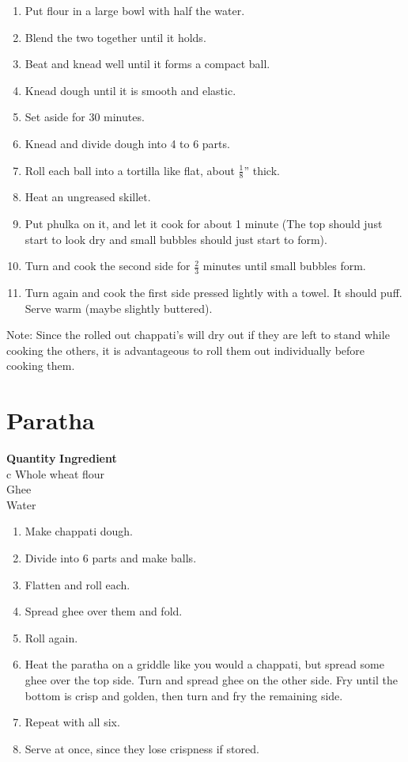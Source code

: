 \begin{enumerate}
\item  Put flour in a large bowl with half the water.
\item Blend the two together until it holds.
\item Beat and knead well until it forms a compact ball.
\item Knead dough until it is smooth and elastic.
\item Set aside for 30 minutes.
\item  Knead and divide dough into 4 to 6 parts.
\item Roll each ball into a tortilla like flat, about $\frac{1}{8}$'' thick.
\item Heat an ungreased skillet.
\item Put phulka on it, and let it cook for about 1 minute (The top should just start to 
look dry and small bubbles should just start to form).
\item Turn and cook the second side for $\frac{2}{3}$ minutes until small 
    bubbles form.
\item  Turn again and cook the first side pressed lightly with a towel.
It should puff. Serve warm (maybe slightly buttered).
\end{enumerate}

Note: Since the rolled out chappati's will dry out if they are left to stand while
cooking the others, it is advantageous to roll them out individually before 
cooking them.

\section{Paratha}
\begin{tabbing}
\hspace{1.0cm}  \={\bf Quantity}   \hspace{3.0cm} \={\bf Ingredient}\\

 c \> Whole wheat flour\\
\> \> Ghee\\
\> \>  Water \\
\end{tabbing}

\begin{enumerate}
\item  Make chappati dough.
\item Divide into 6 parts and make balls.
\item Flatten and roll each. 
\item Spread ghee over them and fold.
\item Roll again.
\item Heat the paratha on a griddle like you would a chappati, but spread
some ghee over the top side.  Turn and spread ghee on the other side.  Fry until
the bottom is crisp and golden, then turn and fry the remaining side.
\item Repeat with all six.
\item  Serve at once, since they lose crispness if stored.
\end{enumerate}

